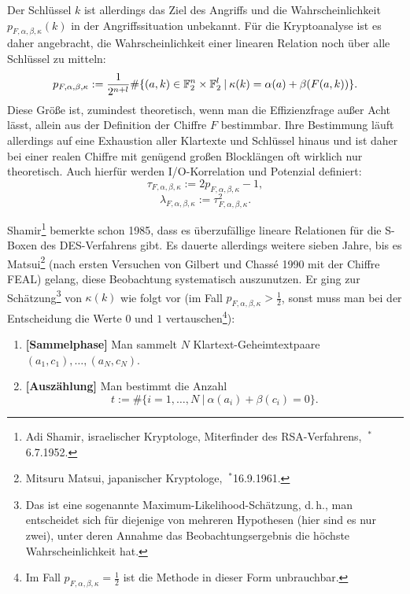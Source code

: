 \begin{refsegment}
Der Schlüssel $k$ ist allerdings das Ziel des Angriffs und die
Wahrscheinlichkeit $p_{F,\alpha,\beta,\kappa}(k)$ in der
Angriffssituation unbekannt. Für die Kryptoanalyse ist es daher
angebracht, die Wahrscheinlichkeit einer linearen Relation noch
über alle Schlüssel zu mitteln:
\begin{equation}\label{eq-bool-avrg}
   p_{F,\alpha,\beta,\kappa} := \frac{1}{2^{n+l}}
      \#\{(a,k) \in \mathbb{F}_2^n \times \mathbb{F}_2^l \:|\:
           \kappa(k) = \alpha(a) + \beta(F(a,k)) \}.
\end{equation}
Diese Größe ist, zumindest theoretisch, wenn man die Effizienzfrage
außer Acht lässt, allein aus der Definition der Chiffre $F$ bestimmbar.
Ihre Bestimmung läuft allerdings auf eine Exhaustion aller Klartexte
und Schlüssel hinaus und ist daher bei einer realen Chiffre mit
genügend großen Blocklängen oft wirklich nur theoretisch.
Auch hierfür werden  I/O-Korrelation und
Potenzial definiert:
\[
   \tau_{F,\alpha,\beta,\kappa} := 2 p_{F,\alpha,\beta,\kappa} - 1,
\]
\[
   \lambda_{F,\alpha,\beta,\kappa} := \tau_{F,\alpha,\beta,\kappa}^2.
\]

Shamir\footnote{%
  Adi Shamir, israelischer Kryptologe, Miterfinder des RSA-Verfahrens,
  $~^{\ast}$6.7.1952.
}
bemerkte schon 1985, dass es überzufällige lineare
Relationen
für die S-Boxen des DES-Verfahrens gibt. Es dauerte allerdings weitere
sieben Jahre, bis es Matsui\footnote{%
  Mitsuru Matsui, japanischer Kryptologe, $~^{\ast}$16.9.1961.
}
(nach ersten Versuchen von Gilbert und Chassé 1990 mit der Chiffre FEAL)
gelang, diese Beobachtung systematisch
auszunutzen. Er ging zur Schätzung\footnote{%
   Das ist eine sogenannte Maximum-Likelihood-Schätzung, d.\,h.,
   man entscheidet sich für diejenige von mehreren Hypothesen (hier
   sind es nur zwei), unter deren Annahme das Beobachtungsergebnis
   die höchste Wahrscheinlichkeit hat.
} von $\kappa(k)$ wie folgt vor
(im Fall $p_{F,\alpha,\beta,\kappa} > \frac{1}{2}$, sonst muss man
bei der Entscheidung die Werte $0$ und $1$ vertauschen\footnote{%
  Im Fall $p_{F,\alpha,\beta,\kappa} = \frac{1}{2}$ ist die
  Methode in dieser Form unbrauchbar.
}):
\begin{enumerate}
	\item \textbf{[Sammelphase]} Man sammelt $N$ Klartext-Geheimtextpaare
	  $(a_1,c_1), \ldots, (a_N,c_N)$.

	\item \textbf{[Auszählung]} Man bestimmt die Anzahl
\[
    t := \# \{i = 1, \ldots, N \:|\: \alpha(a_i) + \beta(c_i) = 0\}.
\]


\end{enumerate}
\end{refsegment}

